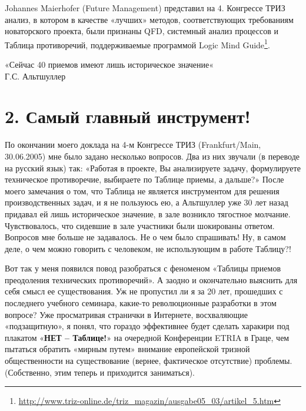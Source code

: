 \documentclass[11pt,a4paper]{article}
\begin{document}
Johannes Maierhofer (Future Management) представил на 4. Конгрессе ТРИЗ
анализ, в котором в качестве «лучших» методов, соответствующих требованиям
новаторского проекта, были признаны QFD, системный анализ процессов и Таблица
противоречий, поддерживаемые программой Logic Mind
Guide\footnote{\url{http://www.triz-online.de/triz_magazin/ausgabe05_03/artikel_5.htm}}.

\clearpage
\begin{flushright}
  «Сейчас 40 приемов имеют лишь историческое значение«\\
  Г.С. Альтшуллер \cite{Altshuller1985}
\end{flushright}
\section*{2. Самый главный инструмент!}

По окончании моего доклада на 4-м Конгрессе ТРИЗ (Frankfurt/Main, 30.06.2005)
мне было задано несколько вопросов. Два из них звучали (в переводе на русский
язык) так: «Работая в проекте, Вы анализируете задачу, формулируете
техническое противоречие, выбираете по Таблице приемы, а дальше?» После моего
замечания о том, что Таблица не является инструментом для решения
производственных задач, и я не пользуюсь ею, а Альтшуллер уже 30 лет назад
придавал ей лишь историческое значение, в зале возникло тягостное молчание.
Чувствовалось, что сидевшие в зале участники были шокированы ответом. Вопросов
мне больше не задавалось. Не о чем было спрашивать! Ну, в самом деле, о чем
можно говорить с человеком, не использующим в работе Таблицу?!

Вот так у меня появился повод разобраться с феноменом «Таблицы приемов
преодоления технических противоречий». А заодно и окончательно выяснить для
себя смысл ее существования. Уж не пропустил ли я за 20 лет, прошедших с
последнего учебного семинара, какие-то революционные разработки в этом
вопросе? Уже просматривая странички в Интернете, восхваляющие «подзащитную», я
понял, что гораздо эффективнее будет сделать харакири под плакатом
«\textbf{НЕТ -- Таблице!}» на очередной Конференции ETRIA в Граце, чем
пытаться обратить «мирным путем» внимание европейской тризной общественности
на существование (вернее, фактическое отсутствие) проблемы. (Собственно, этим
теперь и приходится заниматься).
\end{document}
